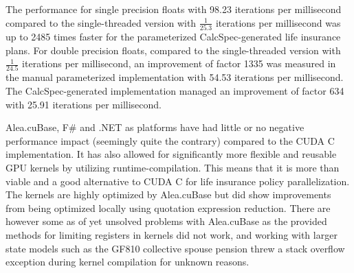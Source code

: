 The performance for single precision floats with 98.23 iterations per millisecond compared to the single-threaded version with $\frac{1}{25.3}$ iterations per millisecond was up to 2485 times faster for the parameterized CalcSpec-generated life insurance plans.
For double precision floats, compared to the single-threaded version with $\frac{1}{24.5}$ iterations per millisecond, an improvement of factor 1335 was measured in the manual parameterized implementation with 54.53 iterations per millisecond. 
The CalcSpec-generated implementation managed an improvement of factor 634 with 25.91 iterations per millisecond.

Alea.cuBase, F\# and .NET as platforms have had little or no negative performance impact (seemingly quite the contrary) compared to the CUDA C implementation.
It has also allowed for significantly more flexible and reusable GPU kernels by utilizing runtime-compilation.
This means that it is more than viable and a good alternative to CUDA C for life insurance policy parallelization.
The kernels are highly optimized by Alea.cuBase but did show improvements from being optimized locally using quotation expression reduction.
There are however some as of yet unsolved problems with Alea.cuBase as the provided methods for limiting registers in kernels did not work, and working with larger state models such as the GF810 collective spouse pension threw a stack overflow exception during kernel compilation for unknown reasons.

\clearpage